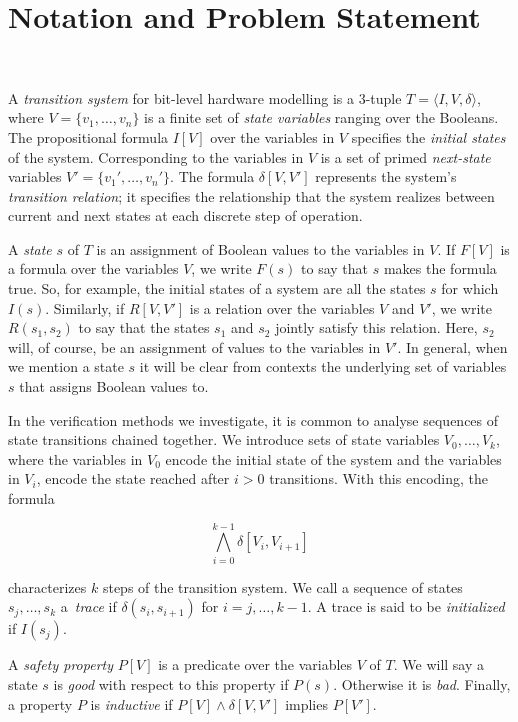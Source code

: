 \section{Notation and Problem Statement}~\label{sec:notation}

A \textit{transition system} for bit-level hardware
modelling is a 3-tuple $T = \langle I,V,\delta \rangle$, where $V = \{v_1,\dots ,v_n\}$
is a finite set of \textit{state variables} ranging over the Booleans.
The propositional formula $I[V]$ over the variables in 
$V$ specifies the \textit{initial states} of the system. 
Corresponding to the variables in $V$ is a set of primed \textit{next-state} variables $V' = \{v_1', \dots, v_n'\}$.
The formula $\delta[V,V']$ represents the system's \textit{transition relation}; it specifies the relationship that the system realizes between current and next states at each discrete step of operation.

A \textit{state} $s$ of $T$ is an assignment of Boolean values to the variables in $V$.
If $F[V]$ is a formula over the variables $V$, we write $F(s)$ to say that $s$ makes the formula true.
So, for example, the initial states of a system are all the states $s$ for which $I(s)$. Similarly, if $R[V,V']$ is a relation over the variables $V$ and $V'$, we write $R(s_1,s_2)$ to say that the states $s_1$ and $s_2$ jointly satisfy this relation. Here, $s_2$ will, of course, be an assignment of values to the variables in $V'$. In general, when we mention a state $s$
it will be clear from contexts the underlying set of variables $s$ that assigns Boolean values to.

In the verification methods we investigate, it is common to analyse sequences of state transitions chained together.
We introduce sets of state variables $V_0, \dots, V_k$, where the variables in $V_0$ encode the initial state of the system and the variables in $V_i$, encode the state reached after $i>0$ transitions. With this encoding, the formula

\[ \bigwedge_{i{=}0}^{k{-}1}\delta[V_i, V_{i+1}]\] 

\noindent characterizes $k$ steps of the transition system.
We call a sequence of states $s_j,\dots,s_k$ a~\textit{trace}
if $\delta(s_i,s_{i{+}1})$ for $i=j,\dots,k{-}1$.  A trace is
said to be \textit{initialized} if $I(s_j)$.
  
A \textit{safety property} $P[V]$ is a predicate over the variables $V$ of $T$.  We will
say a state $s$ is \textit{good} with respect to this property if $P(s)$. Otherwise it is \textit{bad}.
Finally, a property $P$ is \textit{inductive} if $P[V] \wedge \delta[V,V']$ implies $P[V']$.

